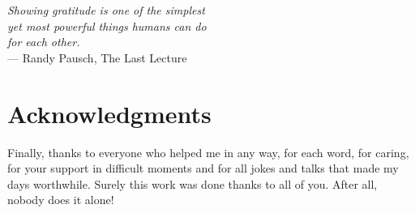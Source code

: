 
\begin{flushright}{\slshape
	Showing gratitude is one of the simplest\\
    yet most powerful things humans can do\\
    for each other.} \\ \medskip
    --- Randy Pausch, The Last Lecture
\end{flushright}

\bigskip

\begingroup
\let\clearpage\relax
\let\cleardoublepage\relax
\let\cleardoublepage\relax
\chapter*{Acknowledgments}








Finally, thanks to everyone who helped me in any way, for each word, for caring, for your support in difficult moments and for all jokes and talks that made my days worthwhile. Surely this work was done thanks to all of you. After all, nobody does it alone!

\bigskip


\endgroup
